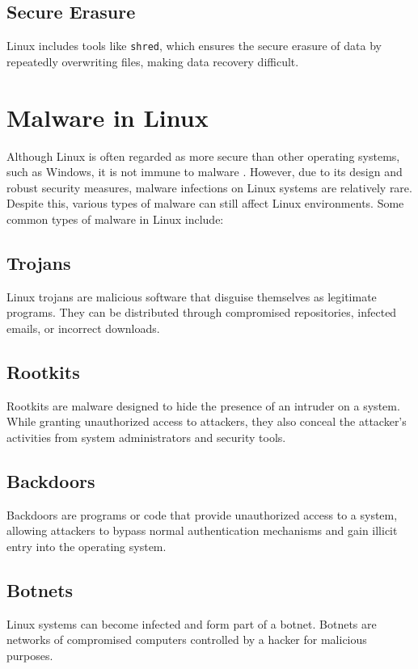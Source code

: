 \documentclass[conference]{IEEEtran}
\begin{document}
\subsection{Secure Erasure}
Linux includes tools like \texttt{shred}, which ensures the secure erasure of data by repeatedly overwriting files, making data recovery difficult.

\section{Malware in Linux}
Although Linux is often regarded as more secure than other operating systems, such as Windows, it is not immune to malware \cite{mend}. However, due to its design and robust security measures, malware infections on Linux systems are relatively rare. Despite this, various types of malware can still affect Linux environments. Some common types of malware in Linux include:

\subsection{Trojans}
Linux trojans are malicious software that disguise themselves as legitimate programs. They can be distributed through compromised repositories, infected emails, or incorrect downloads.

\subsection{Rootkits}
Rootkits are malware designed to hide the presence of an intruder on a system. While granting unauthorized access to attackers, they also conceal the attacker’s activities from system administrators and security tools.

\subsection{Backdoors}
Backdoors are programs or code that provide unauthorized access to a system, allowing attackers to bypass normal authentication mechanisms and gain illicit entry into the operating system.

\subsection{Botnets}
Linux systems can become infected and form part of a botnet. Botnets are networks of compromised computers controlled by a hacker for malicious purposes.
\end{document}
